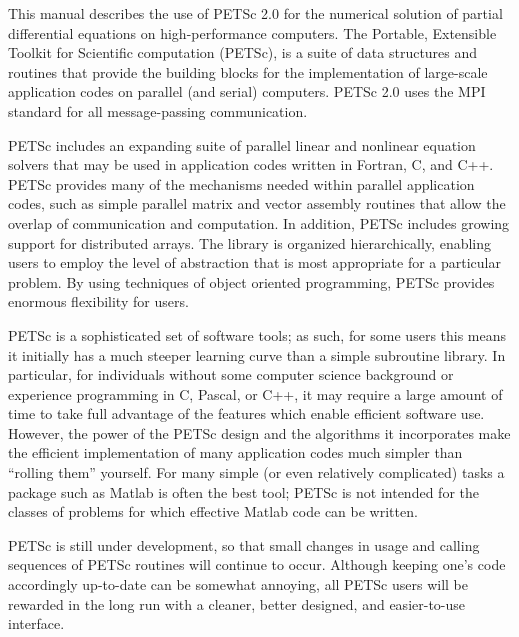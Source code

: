 

\medskip \medskip
This manual describes the use of PETSc 2.0 for the numerical solution
of partial differential equations on high-performance computers.  The
Portable, Extensible Toolkit for Scientific computation (PETSc), is a
suite of data structures and routines that provide the building
blocks for the implementation of large-scale application codes on parallel
(and serial) computers.  PETSc 2.0 uses the MPI standard for all
message-passing communication.

PETSc includes an expanding suite of parallel linear and nonlinear
equation solvers that may be  used in application codes written in
Fortran, C, and C++.  PETSc provides many of the mechanisms needed
within parallel application codes, such as simple parallel matrix and
vector assembly routines that allow the overlap of communication and
computation.  In addition, PETSc includes growing support for
distributed arrays.  The library is organized
hierarchically, enabling users to employ the level of abstraction that
is most appropriate for a particular problem. By using techniques 
of object oriented programming, PETSc provides enormous flexibility 
for users.

PETSc is a sophisticated set of software tools; as such, for some
users this means it initially has a much steeper learning curve than a
simple subroutine library. In particular, for individuals without some
computer science background or experience programming in C,
Pascal, or C++, it may require a large amount of time to take full
advantage of the features which enable efficient software use.
However, the power of the PETSc design and
the algorithms it incorporates make the efficient implementation of
many application codes much simpler than ``rolling them'' yourself.
For many simple (or even relatively complicated) tasks a package such as
Matlab is often the best tool; PETSc is not intended for the classes
of problems for which effective Matlab code can be written.

PETSc is still under development, so that small changes in usage and
calling sequences of PETSc routines will continue to occur.  Although
keeping one's code accordingly up-to-date can be somewhat annoying,
all PETSc users will be rewarded in the long run with a cleaner,
better designed, and easier-to-use interface.
